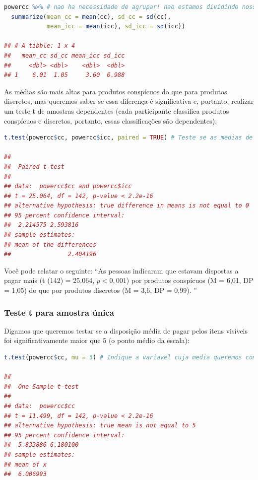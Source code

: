 \documentclass{article}
\begin{document}
\begin{lstlisting}[language=R]
powercc %>% # nao ha necessidade de agrupar! nao estamos dividindo nossa amostra em subgrupos
  summarize(mean_cc = mean(cc), sd_cc = sd(cc),
            mean_icc = mean(icc), sd_icc = sd(icc))
            
## # A tibble: 1 x 4
##   mean_cc sd_cc mean_icc sd_icc
##     <dbl> <dbl>    <dbl>  <dbl>
## 1    6.01  1.05     3.60  0.988
\end{lstlisting}

As médias são mais altas para produtos conspícuos do que para produtos discretos, mas queremos saber se essa diferença é significativa e, portanto, realizar um teste t de amostras dependentes (cada participante classifica produtos conspícuos e discretos, portanto, essas classificações são dependentes):

\begin{lstlisting}[language=R]
t.test(powercc$cc, powercc$icc, paired = TRUE) # Teste se as medias de cc e icc sao diferentes. Indique que este eh um teste t de amostras dependentes com emparelhado = TRUE.

## 
##  Paired t-test
## 
## data:  powercc$cc and powercc$icc
## t = 25.064, df = 142, p-value < 2.2e-16
## alternative hypothesis: true difference in means is not equal to 0
## 95 percent confidence interval:
##  2.214575 2.593816
## sample estimates:
## mean of the differences 
##                2.404196

\end{lstlisting}

Você pode relatar o seguinte: “As pessoas indicaram que estavam dispostas a pagar mais (t (142) = 25.064, $p <0,001$) por produtos conspícuos (M = 6,01, DP = 1,05) do que por produtos discretos (M = 3,6, DP = 0,99). ”

\newpage

\subsubsection{Teste t para amostra única}
Digamos que queremos testar se a disposição média de pagar pelos itens visíveis foi significativamente maior que 5 (o ponto médio da escala):

\begin{lstlisting}[language=R]
t.test(powercc$cc, mu = 5) # Indique a variavel cuja media queremos comparar com um valor especifico (5).

## 
##  One Sample t-test
## 
## data:  powercc$cc
## t = 11.499, df = 142, p-value < 2.2e-16
## alternative hypothesis: true mean is not equal to 5
## 95 percent confidence interval:
##  5.833886 6.180100
## sample estimates:
## mean of x 
##  6.006993
\end{lstlisting}
\end{document}
